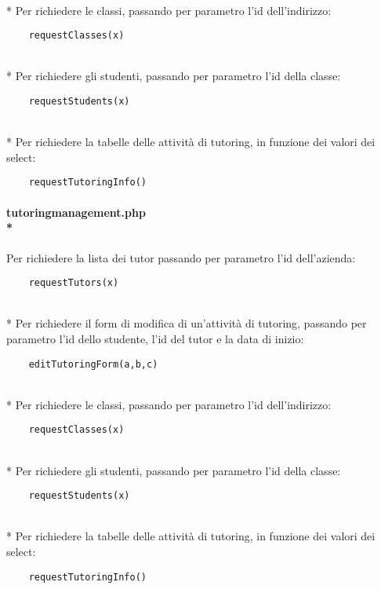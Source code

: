 \documentclass[12pt]{article}
\begin{document}
\\*
\noindent
Per richiedere le classi, passando per parametro l'id dell'indirizzo:
\begin{verbatim}
    requestClasses(x)
\end{verbatim}

\\*
\noindent
Per richiedere gli studenti, passando per parametro l'id della classe:
\begin{verbatim}
    requestStudents(x)
\end{verbatim}
\\*
\noindent
Per richiedere la tabelle delle attività di tutoring, in funzione dei valori dei select:
\begin{verbatim}
    requestTutoringInfo()
\end{verbatim}

\paragraph{tutoringmanagement.php\\*}
\noindent
Per richiedere la lista dei tutor passando per parametro l'id dell'azienda:
\begin{verbatim}
    requestTutors(x)
\end{verbatim}

\\*
\noindent
Per richiedere il form di modifica di un'attività di tutoring, passando per parametro l'id dello studente, l'id del tutor e la data di inizio:
\begin{verbatim}
    editTutoringForm(a,b,c)
\end{verbatim}

\\*
\textbf{}
Per richiedere le classi, passando per parametro l'id dell'indirizzo:
\begin{verbatim}
    requestClasses(x)
\end{verbatim}

\\*
\noindent
Per richiedere gli studenti, passando per parametro l'id della classe:
\begin{verbatim}
    requestStudents(x)
\end{verbatim}
\\*
\noindent
Per richiedere la tabelle delle attività di tutoring, in funzione dei valori dei select:
\begin{verbatim}
    requestTutoringInfo()
\end{verbatim}
\end{document}

